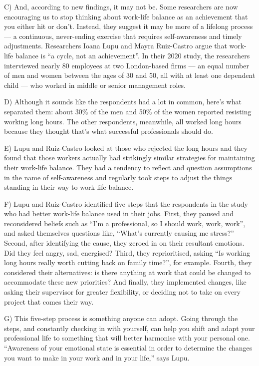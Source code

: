 \documentclass[UTF8,11pt]{ctexart}
\begin{document}
C) And, according to new findings, it may not be. Some researchers are now encouraging us to stop thinking about work-life balance as an achievement that you either hit or don’t. Instead, they suggest it may be more of a lifelong process — a continuous, never-ending exercise that requires self-awareness and timely adjustments. Researchers Ioana Lupu and Mayra Ruiz-Castro argue that work-life balance is “a cycle, not an achievement”. In their 2020 study, the researchers interviewed nearly 80 employees at two London-based firms — an equal number of men and women between the ages of 30 and 50, all with at least one dependent child — who worked in middle or senior management roles.


D) Although it sounds like the respondents had a lot in common, here’s what separated them: about 30\% of the men and 50\% of the women reported resisting working long hours. The other respondents, meanwhile, all worked long hours because they thought that’s what successful professionals should do.


E) Lupu and Ruiz-Castro looked at those who rejected the long hours and they found that those workers actually had strikingly similar strategies for maintaining their work-life balance. They had a tendency to reflect and question assumptions in the name of self-awareness and regularly took steps to adjust the things standing in their way to work-life balance.


F) Lupu and Ruiz-Castro identified five steps that the respondents in the study who had better work-life balance used in their jobs. First, they paused and reconsidered beliefs such as “I’m a professional, so I should work, work, work”, and asked themselves questions like, “What’s currently causing me stress?” Second, after identifying the cause, they zeroed in on their resultant emotions. Did they feel angry, sad, energised? Third, they reprioritised, asking “Is working long hours really worth cutting back on family time?”, for example. Fourth, they considered their alternatives: is there anything at work that could be changed to accommodate these new priorities? And finally, they implemented changes, like asking their supervisor for greater flexibility, or deciding not to take on every project that comes their way.


G) This five-step process is something anyone can adopt. Going through the steps, and constantly checking in with yourself, can help you shift and adapt your professional life to something that will better harmonise with your personal one. “Awareness of your emotional state is essential in order to determine the changes you want to make in your work and in your life,” says Lupu.
\end{document}
